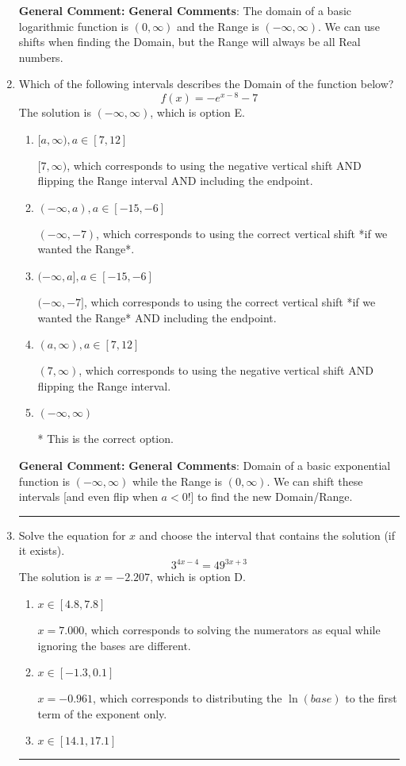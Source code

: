\documentclass{extbook}[14pt]
\newcommand{\litem}[1]{\item #1

\rule{\textwidth}{0.4pt}}
\begin{document}
\begin{enumerate}
{\textbf{General Comment:} \textbf{General Comments}: The domain of a basic logarithmic function is $(0, \infty)$ and the Range is $(-\infty, \infty)$. We can use shifts when finding the Domain, but the Range will always be all Real numbers.
}
\litem{
Which of the following intervals describes the Domain of the function below?
\[ f(x) = -e^{x-8}-7 \]The solution is \( (-\infty, \infty) \), which is option E.\begin{enumerate}[label=\Alph*.]
\item \( [a, \infty), a \in [7, 12] \)

$[7, \infty)$, which corresponds to using the negative vertical shift AND flipping the Range interval AND including the endpoint.
\item \( (-\infty, a), a \in [-15, -6] \)

$(-\infty, -7)$, which corresponds to using the correct vertical shift *if we wanted the Range*.
\item \( (-\infty, a], a \in [-15, -6] \)

$(-\infty, -7]$, which corresponds to using the correct vertical shift *if we wanted the Range* AND including the endpoint.
\item \( (a, \infty), a \in [7, 12] \)

$(7, \infty)$, which corresponds to using the negative vertical shift AND flipping the Range interval.
\item \( (-\infty, \infty) \)

* This is the correct option.
\end{enumerate}

\textbf{General Comment:} \textbf{General Comments}: Domain of a basic exponential function is $(-\infty, \infty)$ while the Range is $(0, \infty)$. We can shift these intervals [and even flip when $a<0$!] to find the new Domain/Range.
}
\litem{
Solve the equation for $x$ and choose the interval that contains the solution (if it exists).
\[ 3^{4x-4} = 49^{3x+3} \]The solution is \( x = -2.207 \), which is option D.\begin{enumerate}[label=\Alph*.]
\item \( x \in [4.8, 7.8] \)

$x = 7.000$, which corresponds to solving the numerators as equal while ignoring the bases are different.
\item \( x \in [-1.3, 0.1] \)

$x = -0.961$, which corresponds to distributing the $\ln(base)$ to the first term of the exponent only.
\item \( x \in [14.1, 17.1] \)


\end{enumerate}}
\end{enumerate}
\end{document}
